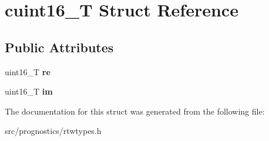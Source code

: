 \hypertarget{structcuint16__T}{}\section{cuint16\+\_\+T Struct Reference}
\label{structcuint16__T}
\subsection*{Public Attributes}
\begin{DoxyCompactItemize}
\item 
\mbox{\label{structcuint16__T_a3af36a6e6471e5295dc1fe777de25b4f}} 
uint16\+\_\+T {\bfseries re}
\item 
\mbox{\label{structcuint16__T_a8b38a2e78bf94870039a5d6178327dae}} 
uint16\+\_\+T {\bfseries im}
\end{DoxyCompactItemize}


The documentation for this struct was generated from the following file\+:\begin{DoxyCompactItemize}
\item 
src/prognostics/rtwtypes.\+h\end{DoxyCompactItemize}
